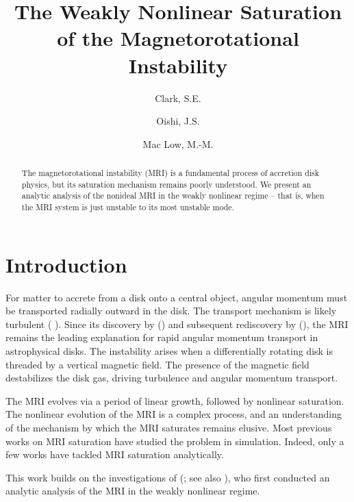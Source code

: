 \documentclass{emulateapj}
\newcommand{\citei}[1]{\citeauthor{#1} \citeyear{#1}}
\begin{document}
\title{The Weakly Nonlinear Saturation of the Magnetorotational Instability}
\author{Clark, S.E.}
\author{Oishi, J.S. }
\author{Mac Low, M.-M.}


\begin{abstract}
The magnetorotational instability (MRI) is a fundamental process of accretion disk physics, but its saturation mechanism remains poorly understood. We present an analytic analysis of the nonideal MRI in the weakly nonlinear regime -- that is, when the MRI system is just unstable to its most unstable mode. 
\end{abstract}



\section{Introduction}

For matter to accrete from a disk onto a central object, angular momentum must be transported radially outward in the disk. The transport mechanism is likely turbulent (\citei{Shakura:1973wg}). Since its discovery by \citeauthor{Chandrasekhar:1960wh} (\citeyear{Chandrasekhar:1960wh}) and subsequent rediscovery by \citeauthor{Balbus:1991vs} (\citeyear{Balbus:1991vs}), the MRI remains the leading explanation for rapid angular momentum transport in astrophysical disks. The instability arises when a differentially rotating disk is threaded by a vertical magnetic field. The presence of the magnetic field destabilizes the disk gas, driving turbulence and angular momentum transport.

The MRI evolves via a period of linear growth, followed by nonlinear saturation. The nonlinear evolution of the MRI is a complex process, and an understanding of the mechanism by which the MRI saturates remains elusive. Most previous works on MRI saturation have studied the problem in simulation. Indeed, only a few works have tackled MRI saturation analytically. 


This work builds on the investigations of \citeauthor{Umurhan:2007hs} (\citeyear{Umurhan:2007hs}; see also \citei{Umurhan:2007dz}), who first conducted an analytic analysis of the MRI in the weakly nonlinear regime.
\end{document}
